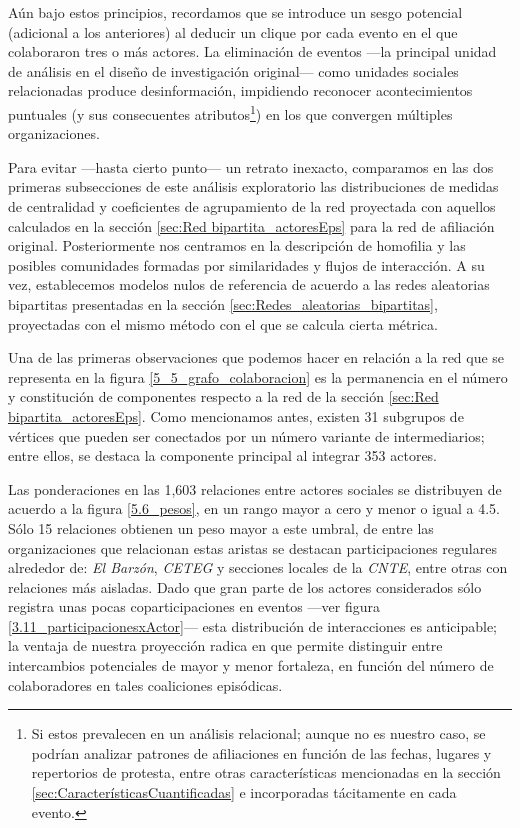 \documentclass[letterpaper, 11pt]{book}
\theoremstyle{definition}
\theoremstyle{remark}
\begin{document}
Aún bajo estos principios, recordamos que se introduce un sesgo potencial (adicional a los anteriores) al deducir un clique por cada evento en el que colaboraron tres o más actores. 
La eliminación de eventos ---la principal unidad de análisis en el diseño de investigación original--- como unidades sociales relacionadas produce desinformación, impidiendo reconocer acontecimientos puntuales (y sus consecuentes atributos\footnote{
    Si estos prevalecen en un análisis relacional; aunque no es nuestro caso, se podrían analizar patrones de afiliaciones en función de las fechas, lugares y repertorios de protesta, entre otras características mencionadas en la sección \ref{sec:CaracterísticasCuantificadas} e incorporadas tácitamente en cada evento. 
}) en los que convergen múltiples organizaciones. 


Para evitar ---hasta cierto punto--- un retrato inexacto, comparamos en las dos primeras subsecciones de este análisis exploratorio las distribuciones de medidas de centralidad y coeficientes de agrupamiento de la red proyectada con aquellos calculados en la sección \ref{sec:Red bipartita_actoresEps} para la red de afiliación original. 
Posteriormente nos centramos en la descripción de homofilia y las posibles comunidades formadas por similaridades y flujos de interacción. 
A su vez, establecemos modelos nulos de referencia de acuerdo a las redes aleatorias bipartitas presentadas en la sección \ref{sec:Redes_aleatorias_bipartitas}, proyectadas con el mismo método con el que se calcula cierta métrica. 

Una de las primeras observaciones que podemos hacer en relación a la red que se representa en la figura \ref{5_5_grafo_colaboracion} es la permanencia en el número y constitución de componentes respecto a la red de la sección \ref{sec:Red bipartita_actoresEps}. 
Como mencionamos antes, existen 31 subgrupos de vértices que pueden ser conectados por un número variante de intermediarios; entre ellos, se destaca la componente principal al integrar 353 actores. 


Las ponderaciones en las 1,603 relaciones entre actores sociales se distribuyen de acuerdo a la figura \ref{5.6_pesos}, en un rango mayor a cero y menor o igual a 4.5. 
Sólo 15 relaciones obtienen un peso mayor a este umbral, de entre las organizaciones que relacionan estas aristas se destacan participaciones regulares alrededor de: \emph{El Barzón}, \emph{CETEG} y secciones locales de la \emph{CNTE}, entre otras con relaciones más aisladas. 
Dado que gran parte de los actores considerados sólo registra unas pocas coparticipaciones en eventos ---ver figura \ref{3.11_participacionesxActor}--- esta distribución de interacciones es anticipable; la ventaja de nuestra proyección radica en que permite distinguir entre intercambios potenciales de mayor y menor fortaleza, en función del número de colaboradores en tales coaliciones episódicas. 
\end{document}
